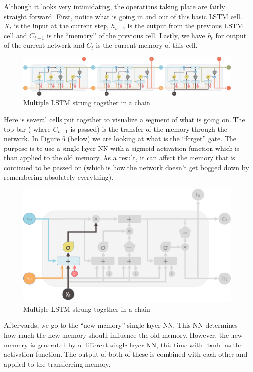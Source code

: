 \documentclass[12pt]{article}
\begin{document}
Although it looks very intimidating, the operations taking place are fairly straight forward. First, notice what is going in and out of this basic LSTM cell. $X_t$ is the input at the current step, $h_{t-1}$ is the output from the previous LSTM cell and $C_{t-1}$ is the ``memory'' of the previous cell. Lastly, we have $h_t$ for output of the current network and $C_t$ is the current memory of this cell. 

\begin{figure}[H]
  \includegraphics[width=\linewidth]{images/MultiLSTM.png}
  \caption{Multiple LSTM strung together in a chain}
\end{figure}

Here is several cells put together to visualize a segment of what is going on. The top bar ( where $C_{t-1}$ is passed) is the transfer of the memory through the network. In Figure 6 (below) we are looking at what is the ``forget'' gate. The purpose is to use a single layer NN with a sigmoid activation function which is than applied to the old memory. As a result, it can affect the memory that is continued to be passed on (which is how the network doesn't get bogged down by remembering absolutely everything). 

\begin{figure}[H]
  \includegraphics[width=\linewidth]{images/FirstValve.png}
  \caption{Multiple LSTM strung together in a chain}
\end{figure}

Afterwards, we go to the ``new memory'' single layer NN. This NN determines how much the new memory should influence the old memory. However, the new memory is generated by a different single layer NN, this time with $\tanh$ as the activation function. The output of both of these is combined with each other and applied to the transferring memory. 
\end{document}
